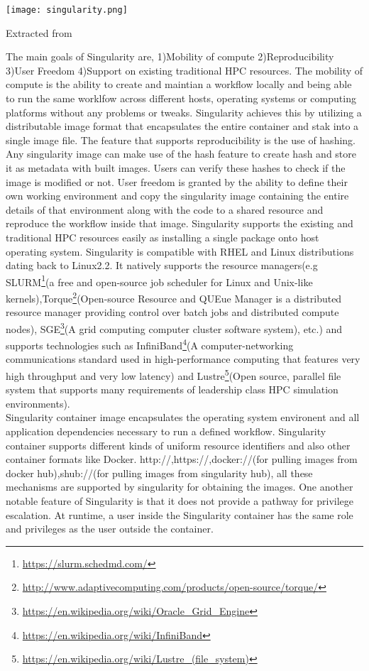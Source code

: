 \begin{center}
\texttt{[image: singularity.png]}
\label{fig:singularity_workflow}
\caption*{Extracted from \cite{10.1371/journal.pone.0177459}}
\end{center}

The main goals of Singularity are, 1)Mobility of compute 2)Reproducibility 3)User Freedom 4)Support on existing traditional HPC resources. The mobility of compute is the ability to create and maintian a workflow locally and being able to run the same worklfow across different hosts, operating systems or computing platforms without any problems or tweaks. Singularity achieves this by utilizing a distributable image format that encapsulates the entire container and stak into a single image file. The feature that supports reproducibility is the use of hashing. Any singularity image can make use of the hash feature to create hash and store it as metadata with built images. Users can verify these hashes to check if the image is modified or not. User freedom is granted by the ability to define their own working environment and copy the singularity image containing the entire details of that environment along with the code to a shared resource and reproduce the workflow inside that image. Singularity supports the existing and traditional HPC resources easily as installing a single package onto host operating system. Singularity is compatible with RHEL and Linux distributions dating back to Linux2.2. It natively supports the resource managers(e.g SLURM\footnote{\url{https://slurm.schedmd.com/}}(a free and open-source job scheduler for Linux and Unix-like kernels),Torque\footnote{\url{http://www.adaptivecomputing.com/products/open-source/torque/}}(Open-source Resource and QUEue Manager is a distributed resource manager providing control over batch jobs and distributed compute nodes), SGE\footnote{\url{https://en.wikipedia.org/wiki/Oracle_Grid_Engine}}(A grid computing computer cluster software system), etc.) and supports technologies such as InfiniBand\footnote{\url{https://en.wikipedia.org/wiki/InfiniBand}}(A computer-networking communications standard used in high-performance computing that features very high throughput and very low latency) and Lustre\footnote{\url{https://en.wikipedia.org/wiki/Lustre_(file_system)}}(Open source, parallel file system that supports many requirements of leadership class HPC simulation environments).\\

Singularity container image encapsulates the operating system environent and all application dependencies necessary to run a defined workflow. Singularity container supports different kinds of uniform resource identifiers and also other container formats like Docker. http://,https://,docker://(for pulling images from docker hub),shub://(for pulling images from singularity hub), all these mechanisms are supported by singularity for obtaining the images. One another notable feature of Singularity is that it does not provide a pathway for privilege escalation. At runtime, a user inside the Singularity container has the same role and privileges as the user outside the container.
 
